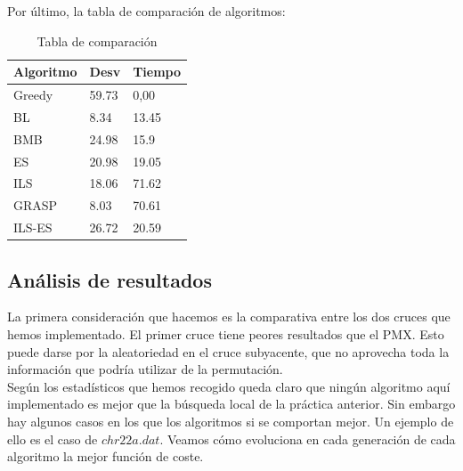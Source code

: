 

















\newpage
Por último, la tabla de comparación de algoritmos:

\begin{table}[htbp]
	\begin{center}
		\begin{tabular}{|l|l|l|}
			\hline
			Algoritmo &  Desv & Tiempo\\
			\hline \hline
			Greedy& 59.73 & 0,00\\ \hline
			BL & 8.34 & 13.45 \\ \hline
			BMB & 24.98 & 15.9\\ \hline
			ES & 20.98& 19.05\\ \hline
			ILS & 18.06 & 71.62\\ \hline
			GRASP & 8.03 & 70.61\\ \hline
			ILS-ES & 26.72 & 20.59\\ \hline
		\end{tabular}
		\caption{Tabla de comparación}
		\label{tabla:TablaComparacion}
	\end{center}
\end{table}

\subsection{Análisis de resultados}

La primera consideración que hacemos es la comparativa entre los dos cruces que hemos implementado. El primer cruce tiene peores resultados que el PMX. Esto puede darse por la aleatoriedad en el cruce subyacente, que no aprovecha toda la información que podría utilizar de la permutación.\\

Según los estadísticos que hemos recogido queda claro que ningún algoritmo aquí implementado es mejor que la búsqueda local de la práctica anterior. Sin embargo hay algunos casos en los que los algoritmos si se comportan mejor. Un ejemplo de ello es el caso de $chr22a.dat$. Veamos cómo evoluciona en cada generación de cada algoritmo la mejor función de coste.

